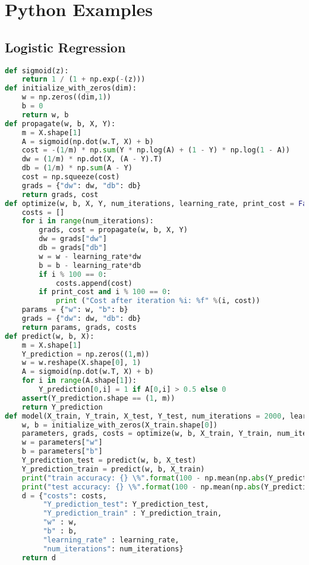 \section{Python Examples}

\subsection{Logistic Regression}

\begin{lstlisting}[language=Python]
def sigmoid(z):
    return 1 / (1 + np.exp(-(z)))
def initialize_with_zeros(dim):
    w = np.zeros((dim,1))
    b = 0
    return w, b
def propagate(w, b, X, Y):
    m = X.shape[1]
    A = sigmoid(np.dot(w.T, X) + b) 
    cost = -(1/m) * np.sum(Y * np.log(A) + (1 - Y) * np.log(1 - A))
    dw = (1/m) * np.dot(X, (A - Y).T)
    db = (1/m) * np.sum(A - Y)
    cost = np.squeeze(cost)
    grads = {"dw": dw, "db": db}
    return grads, cost
def optimize(w, b, X, Y, num_iterations, learning_rate, print_cost = False):
    costs = []
    for i in range(num_iterations):
        grads, cost = propagate(w, b, X, Y)
        dw = grads["dw"]
        db = grads["db"]
        w = w - learning_rate*dw
        b = b - learning_rate*db
        if i % 100 == 0:
            costs.append(cost)
        if print_cost and i % 100 == 0:
            print ("Cost after iteration %i: %f" %(i, cost))
    params = {"w": w, "b": b}
    grads = {"dw": dw, "db": db}
    return params, grads, costs
def predict(w, b, X):
    m = X.shape[1]
    Y_prediction = np.zeros((1,m))
    w = w.reshape(X.shape[0], 1)
    A = sigmoid(np.dot(w.T, X) + b)
    for i in range(A.shape[1]):
        Y_prediction[0,i] = 1 if A[0,i] > 0.5 else 0
    assert(Y_prediction.shape == (1, m))
    return Y_prediction
def model(X_train, Y_train, X_test, Y_test, num_iterations = 2000, learning_rate = 0.5, print_cost = False):
    w, b = initialize_with_zeros(X_train.shape[0])
    parameters, grads, costs = optimize(w, b, X_train, Y_train, num_iterations, learning_rate, print_cost = print_cost)
    w = parameters["w"]
    b = parameters["b"]
    Y_prediction_test = predict(w, b, X_test)
    Y_prediction_train = predict(w, b, X_train)
    print("train accuracy: {} \%".format(100 - np.mean(np.abs(Y_prediction_train - Y_train)) * 100))
    print("test accuracy: {} \%".format(100 - np.mean(np.abs(Y_prediction_test - Y_test)) * 100))
    d = {"costs": costs,
         "Y_prediction_test": Y_prediction_test, 
         "Y_prediction_train" : Y_prediction_train, 
         "w" : w, 
         "b" : b,
         "learning_rate" : learning_rate,
         "num_iterations": num_iterations}
    return d
\end{lstlisting}

